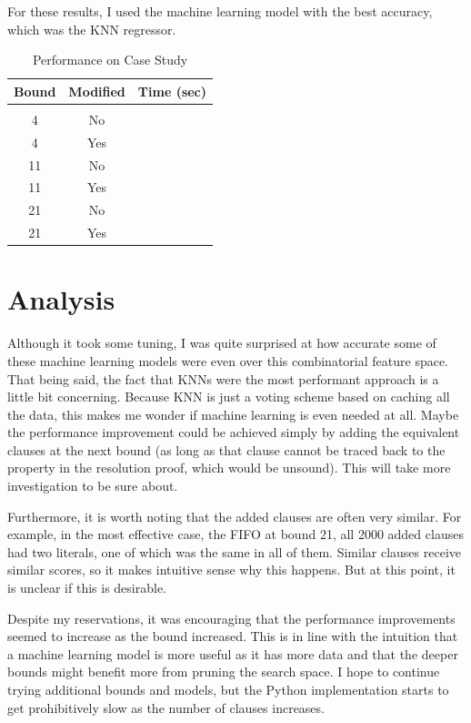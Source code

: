 \documentclass[letterpaper]{article} %
\begin{document}
For these results, I used the machine learning model with the best accuracy, which was the KNN regressor.

\begin{table}[h!]
\centering
\begin{tabular}{ c | c | c }
Bound & Modified & Time (sec) \\
\hline \\
4 & No & \\
4 & Yes & \\
11 & No & \\
11 & Yes & \\
21 & No & \\
21 & Yes & \\
\end{tabular}
\caption{Performance on Case Study}
\label{benchmark}
\end{table}

\section{Analysis}

Although it took some tuning, I was quite surprised at how accurate some of these machine learning models were even over this combinatorial feature space. That being said, the fact that KNNs were the most performant approach is a little bit concerning. Because KNN is just a voting scheme based on caching all the data, this makes me wonder if machine learning is even needed at all. Maybe the performance improvement could be achieved simply by adding the equivalent clauses at the next bound (as long as that clause cannot be traced back to the property in the resolution proof, which would be unsound). This will take more investigation to be sure about.

Furthermore, it is worth noting that the added clauses are often very similar. For example, in the most effective case, the FIFO at bound 21, all 2000 added clauses had two literals, one of which was the same in all of them. Similar clauses receive similar scores, so it makes intuitive sense why this happens. But at this point, it is unclear if this is desirable.

Despite my reservations, it was encouraging that the performance improvements seemed to increase as the bound increased. This is in line with the intuition that a machine learning model is more useful as it has more data and that the deeper bounds might benefit more from pruning the search space. I hope to continue trying additional bounds and models, but the Python implementation starts to get prohibitively slow as the number of clauses increases.
\end{document}
